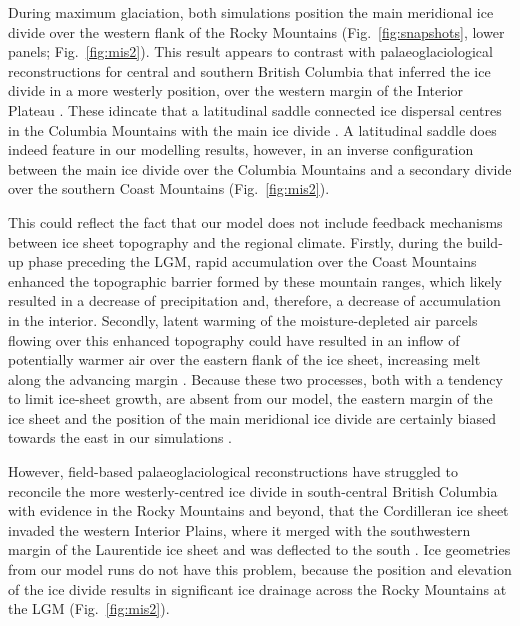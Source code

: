 \documentclass[tc]{copernicus}
\begin{document}
During maximum glaciation, both simulations position the main meridional ice
divide over
the western flank of the Rocky Mountains (Fig.~\ref{fig:snapshots}, lower
panels; Fig.~\ref{fig:mis2}). This result appears to contrast with
palaeoglaciological reconstructions for central and southern British Columbia
that inferred the ice divide in a more westerly position,
over the western margin of the Interior Plateau \citep{Ryder.etal.1991,
Stumpf.etal.2000, Kleman.etal.2010, Clague.Ward.2011, Margold.etal.2013a}.
These idincate that a latitudinal saddle connected ice dispersal centres in
the Columbia Mountains with the main ice divide \citep{Ryder.etal.1991,
Kleman.etal.2010, Clague.Ward.2011, Margold.etal.2013a}. A latitudinal saddle
does indeed feature in our modelling results, however, in an inverse
configuration between the main ice divide over the Columbia Mountains and a
secondary divide over the southern Coast Mountains (Fig.~\ref{fig:mis2}).

This could reflect the fact that our model does not include
feedback mechanisms between ice sheet topography and the regional climate.
Firstly, during the build-up phase preceding the LGM, rapid accumulation over
the Coast Mountains enhanced the topographic barrier formed by these mountain
ranges, which likely resulted in a decrease of precipitation and, therefore,
a decrease of
accumulation in the interior. Secondly, latent warming of the moisture-depleted
air parcels flowing over this enhanced topography could have resulted in an
inflow of potentially warmer air over the eastern flank of the ice sheet,
increasing melt
along the advancing margin \citep[cf.][]{Langen.etal.2012}. Because these two
processes, both with a tendency to limit ice-sheet growth, are absent from
our model, the
eastern margin of the ice sheet and the position of the main meridional ice
divide are certainly biased towards the east in our simulations
\citep{Seguinot.etal.2014}.

However, field-based palaeoglaciological reconstructions have
struggled to reconcile the more westerly-centred ice divide in south-central
British Columbia with evidence in the Rocky Mountains and beyond, that the
Cordilleran ice sheet invaded the western Interior Plains, where it merged with
the southwestern margin of the Laurentide ice sheet and was deflected to the
south \citep{Jackson.etal.1997, Bednarski.Smith.2007, Kleman.etal.2010,
Margold.etal.2013, Margold.etal.2013a}. Ice geometries from our model runs do
not have this problem, because the position and elevation of the ice divide
results in significant ice drainage across the Rocky Mountains at the LGM
(Fig.~\ref{fig:mis2}).
\end{document}
